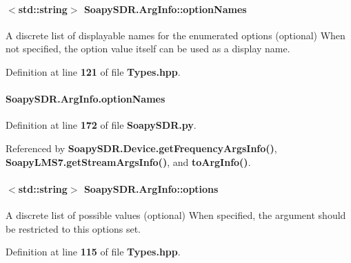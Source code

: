 \paragraph[{option\+Names}]{$<${\bf std\+::string}$>$ Soapy\+S\+D\+R.\+Arg\+Info\+::option\+Names}\label{classSoapySDR_1_1ArgInfo_af7540d2fee100f6a92842c42f905a9b1}
A discrete list of displayable names for the enumerated options (optional) When not specified, the option value itself can be used as a display name. 

Definition at line {\bf 121} of file {\bf Types.\+hpp}.

\paragraph[{option\+Names}]{\setlength{\rightskip}{0pt plus 5cm}Soapy\+S\+D\+R.\+Arg\+Info.\+option\+Names\hspace{0.3cm}{\ttfamily [static]}}\label{classSoapySDR_1_1ArgInfo_a6e75591914192f8a08c720b375f113ed}


Definition at line {\bf 172} of file {\bf Soapy\+S\+D\+R.\+py}.



Referenced by {\bf Soapy\+S\+D\+R.\+Device.\+get\+Frequency\+Args\+Info()}, {\bf Soapy\+L\+M\+S7.\+get\+Stream\+Args\+Info()}, and {\bf to\+Arg\+Info()}.

\paragraph[{options}]{$<${\bf std\+::string}$>$ Soapy\+S\+D\+R.\+Arg\+Info\+::options}\label{classSoapySDR_1_1ArgInfo_a5728cabc373ac847658b6083a8d05a39}
A discrete list of possible values (optional) When specified, the argument should be restricted to this options set. 

Definition at line {\bf 115} of file {\bf Types.\+hpp}.

